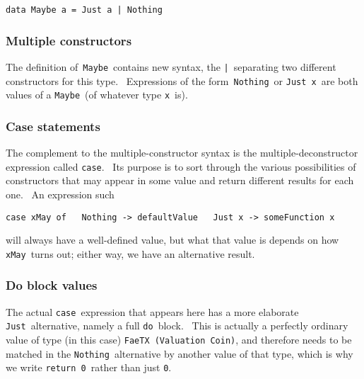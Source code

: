 \documentclass[11pt]{article}
\newcommand{\codeblock}[1]{\begin{mdframed}[
    backgroundcolor=header-color,
    linecolor=header-color,
    innertopmargin=10pt,
    ]{\texttt{#1}}\end{mdframed}}
\begin{document}
\codeblock{data Maybe a = Just a | Nothing}

\subsubsection{Multiple constructors}
\vspace{5.5pt}

The definition of \texttt{Maybe} contains new syntax, the \texttt{|} separating two different constructors for this type.  Expressions of the form \texttt{Nothing} or \texttt{Just x} are both values of a \texttt{Maybe} (of whatever type \texttt{x} is).

\subsubsection{Case statements}
\vspace{5.5pt}

The complement to the multiple-constructor syntax is the multiple-deconstructor expression called \texttt{case}.  Its purpose is to sort through the various possibilities of constructors that may appear in some value and return different results for each one.  An expression such

\codeblock{case xMay of\newline
  Nothing -\textgreater{} defaultValue\newline
  Just x -\textgreater{} someFunction x}

will always have a well-defined value, but what that value is depends on how \texttt{xMay} turns out; either way, we have an alternative result.

\subsubsection{Do block values}
\vspace{5.5pt}

The actual \texttt{case} expression that appears here has a more elaborate \texttt{Just} alternative, namely a full \texttt{do} block.  This is actually a perfectly ordinary value of type (in this case) \texttt{FaeTX (Valuation Coin)}, and therefore needs to be matched in the \texttt{Nothing} alternative by another value of that type, which is why we write \texttt{return 0} rather than just \texttt{0}.

\end{document}
